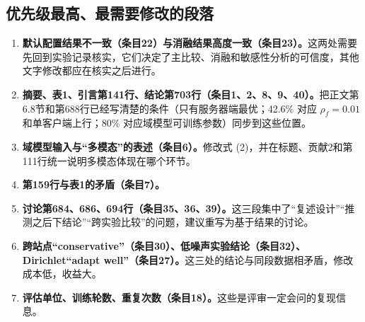 \documentclass[11pt,a4paper]{ctexart}
\begin{document}
\subsection{优先级最高、最需要修改的段落}
\begin{enumerate}[leftmargin=*]
\item \textbf{默认配置结果不一致（条目22）与消融结果高度一致（条目23）。}这两处需要先回到实验记录核实，它们决定了主比较、消融和敏感性分析的可信度，其他文字修改都应在核实之后进行。
\item \textbf{摘要、表1、引言第141行、结论第703行（条目1、2、8、9、40）。}把正文第6.8节和第688行已经写清楚的条件（只有服务器端最优；42.6\% 对应 $\rho_f=0.01$ 和单客户端上行；80\% 对应域模型可训练参数）同步到这些位置。
\item \textbf{域模型输入与“多模态”的表述（条目6）。}修改式 (2)，并在标题、贡献2和第111行统一说明多模态体现在哪个环节。
\item \textbf{第159行与表1的矛盾（条目7）。}
\item \textbf{讨论第684、686、694行（条目35、36、39）。}这三段集中了“复述设计”“推测之后下结论”“跨实验比较”的问题，建议重写为基于结果的讨论。
\item \textbf{跨站点“conservative”（条目30）、低噪声实验结论（条目32）、Dirichlet“adapt well”（条目27）。}这三处的结论与同段数据相矛盾，修改成本低，收益大。
\item \textbf{评估单位、训练轮数、重复次数（条目18）。}这些是评审一定会问的复现信息。
\end{enumerate}
\end{document}
